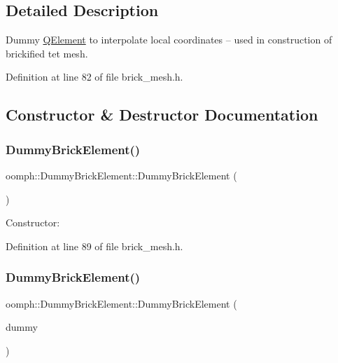 \subsection{Detailed Description}
Dummy \hyperlink{classoomph_1_1QElement}{Q\+Element} to interpolate local coordinates -- used in construction of brickified tet mesh. 

Definition at line 82 of file brick\+\_\+mesh.\+h.



\subsection{Constructor \& Destructor Documentation}
\mbox{\label{classoomph_1_1DummyBrickElement_ae95606b8512a61a7288505021f9e5ad9}} 
\subsubsection{\texorpdfstring{Dummy\+Brick\+Element()}{DummyBrickElement()}\hspace{0.1cm}{\footnotesize\ttfamily [1/2]}}
{\footnotesize\ttfamily oomph\+::\+Dummy\+Brick\+Element\+::\+Dummy\+Brick\+Element (\begin{DoxyParamCaption}{ }\end{DoxyParamCaption})\hspace{0.3cm}{\ttfamily [inline]}}



Constructor\+: 



Definition at line 89 of file brick\+\_\+mesh.\+h.

\mbox{\label{classoomph_1_1DummyBrickElement_a444eeafc5ef040e21f20a73366da567c}} 
\subsubsection{\texorpdfstring{Dummy\+Brick\+Element()}{DummyBrickElement()}\hspace{0.1cm}{\footnotesize\ttfamily [2/2]}}
{\footnotesize\ttfamily oomph\+::\+Dummy\+Brick\+Element\+::\+Dummy\+Brick\+Element (\begin{DoxyParamCaption}\item[{const \hyperlink{classoomph_1_1DummyBrickElement}{Dummy\+Brick\+Element} \&}]{dummy }\end{DoxyParamCaption})\hspace{0.3cm}{\ttfamily [inline]}}



